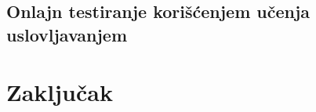 \documentclass[11pt]{beamer}
\theoremstyle{definition}
\begin{document}
\subsection{Onlajn testiranje korišćenjem učenja uslovljavanjem }

\section{Zaključak}
\label{sec:zakljucak}
\end{document}
